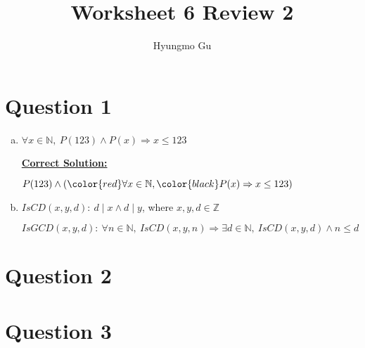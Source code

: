 \documentclass[12pt]{article}
\begin{document}
\title{Worksheet 6 Review 2}
\author{Hyungmo Gu}
\maketitle

\section*{Question 1}
\begin{enumerate}[a.]
    \item

    $\forall x \in \mathbb{N},\:P(123) \land P(x) \Rightarrow x \leq 123$

    \bigskip

    \begin{mdframed}
        \underline{\textbf{Correct Solution:}}

        \bigskip

        $P(123) \land (\color{red}\forall x \in \mathbb{N},\color{black} P(x) \Rightarrow x \leq 123)$
    \end{mdframed}

    \item

    $IsCD(x,y,d):\:d \mid x \land d \mid y$, where $x,y,d \in \mathbb{Z}$

    \bigskip

    $IsGCD(x,y,d):\:\forall n \in \mathbb{N},\:IsCD(x,y,n) \Rightarrow \exists d
    \in \mathbb{N},\:IsCD(x,y,d) \land n \leq d$
\end{enumerate}

\section*{Question 2}

\section*{Question 3}
\end{document}
